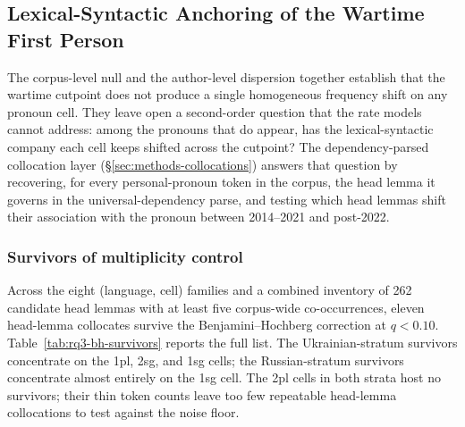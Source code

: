 \documentclass[12pt]{interact}
\theoremstyle{plain}%
\theoremstyle{definition}
\theoremstyle{remark}
\begin{document}
\subsection{Lexical-Syntactic Anchoring of the Wartime First Person}
\label{sec:results-rq3}

The corpus-level null and the author-level dispersion together establish that the wartime cutpoint does not produce a single homogeneous frequency shift on any pronoun cell. They leave open a second-order question that the rate models cannot address: among the pronouns that do appear, has the lexical-syntactic company each cell keeps shifted across the cutpoint? The dependency-parsed collocation layer (\S\ref{sec:methods-collocations}) answers that question by recovering, for every personal-pronoun token in the corpus, the head lemma it governs in the universal-dependency parse, and testing which head lemmas shift their association with the pronoun between 2014--2021 and post-2022.

\subsubsection{Survivors of multiplicity control}

Across the eight (language, cell) families and a combined inventory of 262 candidate head lemmas with at least five corpus-wide co-occurrences, eleven head-lemma collocates survive the Benjamini--Hochberg correction at $q < 0.10$. Table~\ref{tab:rq3-bh-survivors} reports the full list. The Ukrainian-stratum survivors concentrate on the 1pl, 2sg, and 1sg cells; the Russian-stratum survivors concentrate almost entirely on the 1sg cell. The 2pl cells in both strata host no survivors; their thin token counts leave too few repeatable head-lemma collocations to test against the noise floor.
\end{document}
